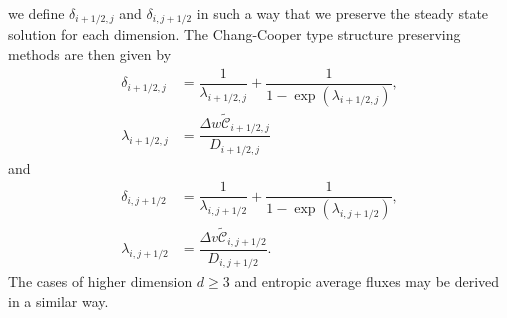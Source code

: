 \documentclass[a4paper]{article}
\theoremstyle{remark}\newtheorem{remark}{Remark}
\newcommand{\C}{\mathcal{C}}
\newcommand{\be}{\begin{equation}}
\newcommand{\ee}{\end{equation}}
\begin{document}
we define $\delta_{i+1/2,j}$ and $\delta_{i,j+1/2}$ in such a way that we preserve the steady state solution for each dimension. The Chang-Cooper type structure preserving methods are then given by
\be\begin{split}\label{eq:delta2D_1}
\delta_{i+1/2,j}     &= \dfrac{1}{\lambda_{i+1/2,j}}+\dfrac{1}{1-\exp(\lambda_{i+1/2,j})},\\
\lambda_{i+1/2,j} &= \dfrac{\Delta w \tilde{\C}_{i+1/2,j}}{D_{i+1/2,j}}
\end{split}\ee
and
\be\begin{split}\label{eq:delta2D_2}
\delta_{i,j+1/2}     &= \dfrac{1}{\lambda_{i,j+1/2}}+\dfrac{1}{1-\exp(\lambda_{i,j+1/2})},\\
\lambda_{i,j+1/2} &= \dfrac{\Delta v \tilde{\C}_{i,j+1/2}}{D_{i,j+1/2}}.
\end{split}\ee
The cases of higher dimension $d\ge 3$ and entropic average fluxes may be derived in a 
similar way. 
\end{document}
